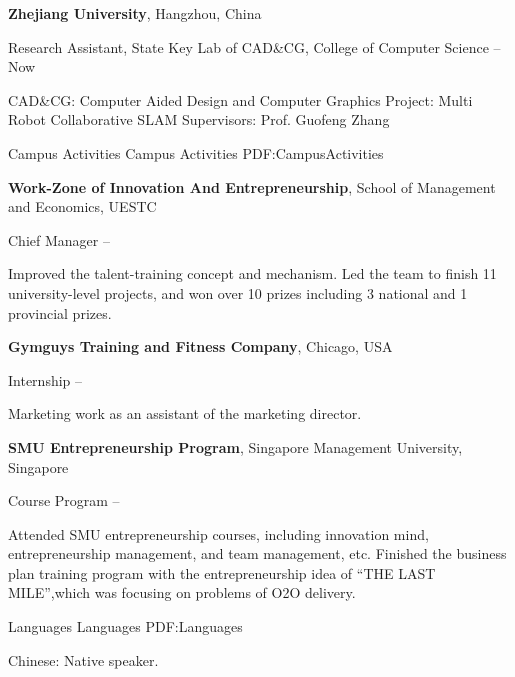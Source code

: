 \documentclass[letterpaper,MMMyyyy,nonstopmode]{simpleresumecv}
\begin{document}
\begin{Body}
\Gap
\Entry
{\textbf{Zhejiang University}},
Hangzhou, China

\BulletItem
Research Assistant,
State Key Lab of CAD\&CG,
College of Computer Science
\hfill
{} --
Now
\begin{Detail}
	\SubBulletItem
	CAD\&CG: Computer Aided Design and Computer Graphics
	\SubBulletItem
	Project: Multi Robot Collaborative SLAM
	\SubBulletItem
	Supervisors:
	Prof. Guofeng Zhang
\end{Detail}

\Section
{Campus Activities}
{Campus Activities}
{PDF:CampusActivities}

\Entry
{\textbf{Work-Zone of Innovation And Entrepreneurship}},
School of Management and Economics, 
UESTC

\BulletItem
Chief Manager
\hfill
{} --
\begin{Detail}
\SubBulletItem
Improved the talent-training concept and mechanism.
\SubBulletItem
Led the team to finish 11 university-level projects, and won over 10 prizes including 3 national
 and 1 provincial prizes.
\end{Detail}

\Gap
{\textbf{Gymguys Training and Fitness Company}},
Chicago, 
USA

\BulletItem
Internship
\hfill
{} --
\begin{Detail}
	\SubBulletItem
	Marketing work as an assistant of the marketing director.
\end{Detail}

\Gap
{\textbf{SMU Entrepreneurship Program}},
Singapore Management University,
Singapore

\BulletItem
Course Program
\hfill
{} --
\begin{Detail}
\SubBulletItem
Attended SMU entrepreneurship courses, including innovation mind, entrepreneurship management, and team management, etc.
\SubBulletItem
Finished the business plan training program with the entrepreneurship idea of “THE LAST MILE”,which was focusing on problems of O2O delivery.
\end{Detail}



\Section
{Languages}
{Languages}
{PDF:Languages}

\BulletItem
Chinese: Native speaker.


\end{Body}
\end{document}
